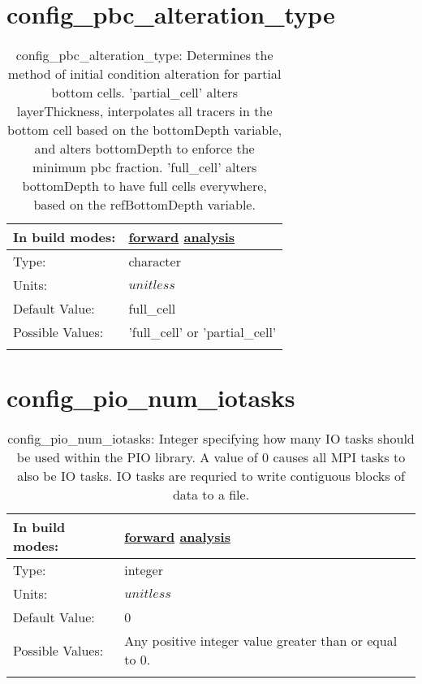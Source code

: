 \section[config\_pbc\_alteration\_type]{config\_pbc\_alteration\_type}
\label{sec:nm_sec_config_pbc_alteration_type}
\begin{center}
\begin{longtable}{| p{2.0in} || p{4.0in} |}
    \hline
    In build modes: & \hyperref[subsec:forward_nm_tab_partial_bottom_cells]{forward} \hyperref[subsec:analysis_nm_tab_partial_bottom_cells]{analysis} \\
    \hline
    Type: & character \\
    \hline
    Units: & $unitless$ \\
    \hline
    Default Value: & full\_cell \\
    \hline
    Possible Values: & 'full\_cell' or 'partial\_cell' \\
    \hline
    \caption{config\_pbc\_alteration\_type: Determines the method of initial condition alteration for partial bottom cells.  'partial\_cell' alters layerThickness, interpolates all tracers in the bottom cell based on the bottomDepth variable, and alters bottomDepth to enforce the minimum pbc fraction.  'full\_cell' alters bottomDepth to have full cells everywhere, based on the refBottomDepth variable.}
\end{longtable}
\end{center}
\section[config\_pio\_num\_iotasks]{config\_pio\_num\_iotasks}
\label{sec:nm_sec_config_pio_num_iotasks}
\begin{center}
\begin{longtable}{| p{2.0in} || p{4.0in} |}
    \hline
    In build modes: & \hyperref[subsec:forward_nm_tab_io]{forward} \hyperref[subsec:analysis_nm_tab_io]{analysis} \\
    \hline
    Type: & integer \\
    \hline
    Units: & $unitless$ \\
    \hline
    Default Value: & 0 \\
    \hline
    Possible Values: & Any positive integer value greater than or equal to 0. \\
    \hline
    \caption{config\_pio\_num\_iotasks: Integer specifying how many IO tasks should be used within the PIO library. A value of 0 causes all MPI tasks to also be IO tasks. IO tasks are requried to write contiguous blocks of data to a file.}
\end{longtable}
\end{center}
